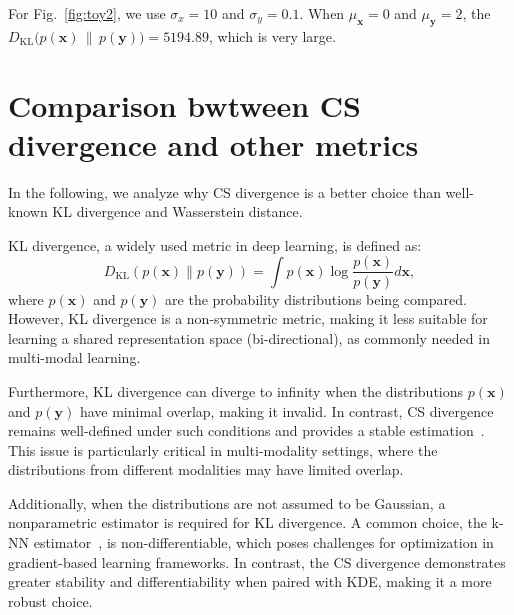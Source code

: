 For Fig.~\ref{fig:toy2}, we use $\sigma_x = 10$ and $\sigma_y=0.1$. When \(\mu_\mathbf{x} = 0\) and \(\mu_\mathbf{y} = 2\), the \(D_{\mathrm{KL}}\bigl(p(\mathbf{x})\,\|\,p(\mathbf{y})\bigr) = 5194.89\), which is very large. 





\section{Comparison bwtween CS divergence and other metrics}
\label{sec:cs-compare}




In the following, we analyze why CS divergence is a better choice than well-known KL divergence and Wasserstein distance. 

 KL divergence, a widely used metric in deep learning, is defined as: 
\begin{equation}
    D_{\text{KL}}(p(\mathbf{x}) \| p(\mathbf{y})) = \int p(\mathbf{x}) \log \frac{p(\mathbf{x})}{p(\mathbf{y})} d\mathbf{x},
\end{equation}
where \(p(\mathbf{x})\) and \(p(\mathbf{y})\) are the probability distributions being compared. However, KL divergence is a non-symmetric metric, making it less suitable for learning a shared representation space (bi-directional), as commonly needed in multi-modal learning. 

 Furthermore, KL divergence can diverge to infinity when the distributions \(p(\mathbf{x})\) and \(p(\mathbf{y})\) have minimal overlap, making it invalid. In contrast, CS divergence remains well-defined under such conditions and provides a stable estimation~\citep{yu2024cauchy,yindomain}. This issue is particularly critical in multi-modality settings, where the distributions from different modalities may have limited overlap. 

 Additionally, when the distributions are not assumed to be Gaussian, a nonparametric estimator is required for KL divergence. A common choice, the k-NN estimator~\citep{wang2009divergence}, is non-differentiable, which poses challenges for optimization in gradient-based learning frameworks. In contrast, the CS divergence demonstrates greater stability and differentiability when paired with KDE, making it a more robust choice.


